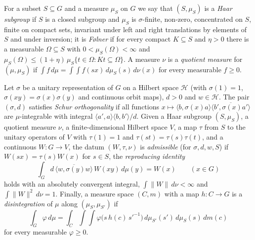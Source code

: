 \begin{definition}\label{pf:sh-local:def:wabs}
For a subset $S\subseteq G$ and a measure $\mu_S$ on $G$ we say that $(S,\mu_S)$ is a \emph{Haar subgroup} if $S$ is a
closed subgroup and $\mu_S$ is $\sigma$-finite, non-zero, concentrated on $S$, finite on compact sets, invariant
under left and right translations by elements of $S$ and under inversion; it is \emph{F\o lner} if for every compact
$K\subseteq S$ and $\eta>0$ there is a measurable $\Omega\subseteq S$ with $0<\mu_S(\Omega)<\infty$ and
$\mu_S(\Omega)\le(1+\eta)\,\mu_S\{t\in\Omega:Kt\subseteq\Omega\}$. A measure $\nu$ is a \emph{quotient measure} for
$(\mu,\mu_S)$ if $\int f\,d\mu=\int\!\int f(sx)\,d\mu_S(s)\,d\nu(x)$ for every measurable $f\ge0$.

Let $\sigma$ be a unitary representation of $G$ on a Hilbert space $\mathcal H$ (with $\sigma(1)=1$,
$\sigma(xy)=\sigma(x)\sigma(y)$ and continuous orbit maps), $d>0$ and $w\in\mathcal H$. The pair $(\sigma,d)$
satisfies \emph{Schur orthogonality} if all functions $x\mapsto\langle b,\sigma(x)a\rangle\overline{\langle
b',\sigma(x)a'\rangle}$ are $\mu$-integrable with integral $\langle a',a\rangle\langle b,b'\rangle/d$. Given a
Haar subgroup $(S,\mu_S)$, a quotient measure $\nu$, a finite-dimensional Hilbert space $V$, a map $\tau$ from $S$
to the unitary operators of $V$ with $\tau(1)=1$ and $\tau(st)=\tau(s)\tau(t)$, and a continuous $W:G\to V$, the
datum $(W,\tau,\nu)$ is \emph{admissible} (for $\sigma,d,w,S$) if $W(sx)=\tau(s)W(x)$ for $s\in S$, the
\emph{reproducing identity}
\begin{equation}\label{eq:pf:sh-local:wrepro}
\int_G d\,\overline{\langle w,\sigma(y)w\rangle}\,W(xy)\,d\mu(y)=W(x)\qquad(x\in G)
\end{equation}
holds with an absolutely convergent integral, $\int\|W\|\,d\nu<\infty$ and $\int\|W\|^2\,d\nu=1$. Finally, a measure
space $(C,m)$ with a map $h:C\to G$ is a \emph{disintegration} of $\mu$ along $(\mu_S,\mu_{S'})$ if
\begin{equation}\label{eq:pf:sh-local:disint}
\int_G\varphi\,d\mu=\int_C\int\!\!\int\varphi\bigl(s\,h(c)\,s'^{-1}\bigr)\,d\mu_{S'}(s')\,d\mu_S(s)\,dm(c)
\end{equation}
for every measurable $\varphi\ge0$.
\end{definition}

